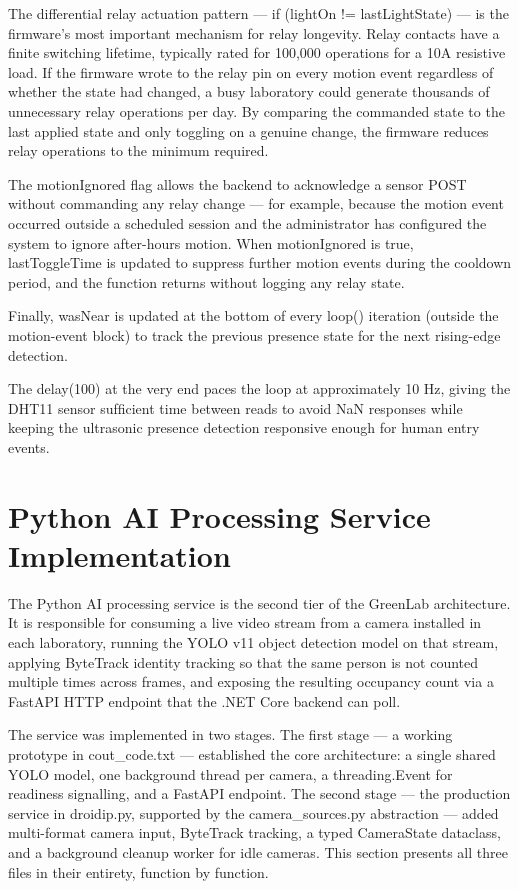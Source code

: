 The differential relay actuation pattern --- if (lightOn != lastLightState) ---
is the ﬁrmware's most important mechanism for relay longevity. Relay contacts have a
ﬁnite switching lifetime, typically rated for 100,000 operations for a 10A resistive load. If
the ﬁrmware wrote to the relay pin on every motion event regardless of whether the state
had changed, a busy laboratory could generate thousands of unnecessary relay operations
per day. By comparing the commanded state to the last applied state and only toggling on
a genuine change, the ﬁrmware reduces relay operations to the minimum required.

The motionIgnored ﬂag allows the backend to acknowledge a sensor POST without
commanding any relay change --- for example, because the motion event occurred outside
a scheduled session and the administrator has conﬁgured the system to ignore after-hours
motion. When motionIgnored is true, lastToggleTime is updated to suppress further
motion events during the cooldown period, and the function returns without logging any
relay state.

Finally, wasNear is updated at the bottom of every loop() iteration (outside the
motion-event block) to track the previous presence state for the next rising-edge detection.



The delay(100) at the very end paces the loop at approximately 10 Hz, giving the DHT11
sensor sufﬁcient time between reads to avoid NaN responses while keeping the ultrasonic
presence detection responsive enough for human entry events.



\section{Python AI Processing Service Implementation}


The Python AI processing service is the second tier of the GreenLab architecture. It is
responsible for consuming a live video stream from a camera installed in each laboratory,
running the YOLO v11 object detection model on that stream, applying ByteTrack identity
tracking so that the same person is not counted multiple times across frames, and exposing
the resulting occupancy count via a FastAPI HTTP endpoint that the .NET Core backend
can poll.

The service was implemented in two stages. The ﬁrst stage --- a working prototype
in cout\_code.txt --- established the core architecture: a single shared YOLO model, one
background thread per camera, a threading.Event for readiness signalling, and a FastAPI
endpoint. The second stage --- the production service in droidip.py, supported by the
camera\_sources.py abstraction --- added multi-format camera input, ByteTrack tracking,
a typed CameraState dataclass, and a background cleanup worker for idle cameras. This
section presents all three ﬁles in their entirety, function by function.



